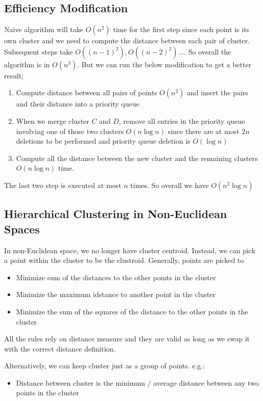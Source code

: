 \subsection{Efficiency Modification} 
Naive algorithm will take $O(n^2)$ time for the first step since each point is its own cluster and we need to compute the distance between each pair of cluster. Subsequent steps take $O((n-1)^2), O((n-2)^2)...$. So overall the algorithm is in $O(n^3)$. But we can run the below modification to get a better result; 
    \begin{enumerate}
        \item Compute distance between all pairs of points $O(n^2)$ and insert the pairs and their distance into a priority queue
        \item When we merge cluster $C$ and $D$, remove all entries in the priority queue involving one of those two clusters $O(n\log n)$ since there are at most $2n$ deletions to be performed and priority queue deletion is $O(\log n)$
        \item Compute all the distance between the new cluster and the remaining clusters $O(n\log n)$ time. 
    \end{enumerate}
The last two step is executed at most $n$ times. So overall we have $O(n^2 \log n)$

\subsection{Hierarchical Clustering in Non-Euclidean Spaces} 
In non-Euclidean space, we no longer have cluster centroid. Instead, we can pick a point within the cluster to be the clustroid. Generally, points are picked to 
    \begin{itemize}
        \item Minimize sum of the distances to the other points in the cluster
        \item Minimize the maximum idstance to another point in the cluster
        \item Minimize the sum of the squares of the distance to the other points in the cluster 
    \end{itemize}
All the rules rely on distance measure and they are valid as long as we swap it with the correct distance definition. 

Alternatively, we can keep cluster just as a group of points. e.g.: 
    \begin{itemize}
        \item Distance between cluster is the minimum / average distance between any two points in the cluster
    \end{itemize}



